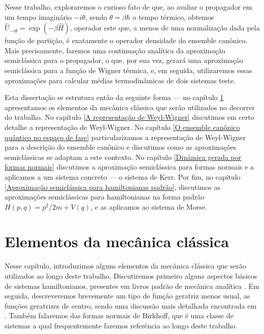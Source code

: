\documentclass[
	12pt,
	oneside,			%
	a4paper,			%
	english,			%
	brazil				%
	]{abntex2}
\theoremstyle{definition}
\begin{document}
Nesse trabalho, exploraremos o curioso fato de que, ao avaliar o propagador em um tempo imaginário $-i\theta$, sendo $\theta = \beta \hbar$ o tempo térmico, obtemos $\hat{U}_{-i\theta} = \exp \left( -\beta \hat{H} \right)$, operador este que, a menos de uma normalização dada pela função de partição, é exatamente o operador densidade do ensemble canônico. Mais precisamente, faremos uma continuação analítica da aproximação semiclássica para o propagador, o que, por sua vez, gerará uma aproximação semiclássica para a função de Wigner térmica, e, em seguida, utilizaremos essas aproximações para calcular médias termodinâmicas de dois sistemas teste.

Esta dissertação se estrutura então da seguinte forma — no capítulo \ref{Elementos da mecânica clássica} apresentamos os elementos da mecânica clássica que serão utilizados no decorrer do trabalho. No capítulo \ref{A representação de Weyl-Wigner} discutimos em certo detalhe a representação de Weyl-Wigner. No capítulo \ref{O ensemble canônico quântico no espaço de fase} particularizamos a representação de Weyl-Wigner para a descrição do ensemble canônico e discutimos como as aproximações semiclássicas se adaptam a este contexto. No capítulo \ref{Dinâmica gerada por formas normais} discutimos a aproximação semiclássica para formas normais e a aplicamos a um sistema concreto — o sistema de Kerr. Por fim, no capítulo \ref{Aproximação semiclássica para hamiltonianas padrão}, discutimos as aproximações semiclássicas para hamiltonianas na forma padrão $H(p,q) = p^2/2m + V(q)$, e as aplicamos ao sistema de Morse.

\chapter{Elementos da mecânica clássica}
\label{Elementos da mecânica clássica}

Nesse capítulo, introduzimos alguns elementos da mecânica clássica que serão utilizados ao longo deste trabalho. Discutiremos primeiro alguns aspectos básicos de sistemas hamiltonianos, presentes em livros padrão de mecânica analítica \cite{josé1998classical,goldstein2002classical,lemos2018analytical}. Em seguida, descreveremos brevemente um tipo de função geratriz menos usual, as funções geratrizes de centro, sendo uma discussão mais detalhada encontrada em \cite{DEALMEIDA1998265}. Também falaremos das formas normais de Birkhoff, que é uma classe de sistemas a qual frequentemente faremos referência ao longo deste trabalho.
\end{document}
